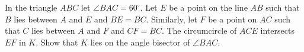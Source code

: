 In the triangle $ABC$ let $\angle BAC = 60^\circ$. Let $E$ be a point on the line $AB$ such
that $B$ lies between $A$ and $E$ and $BE = BC$. Similarly, let $F$ be a point on $AC$ such
that $C$ lies between $A$ and $F$ and $CF = BC$. The circumcircle of $ACE$ intersects $EF$ in $K$.
Show that $K$ lies on the angle bisector of $\angle BAC$.